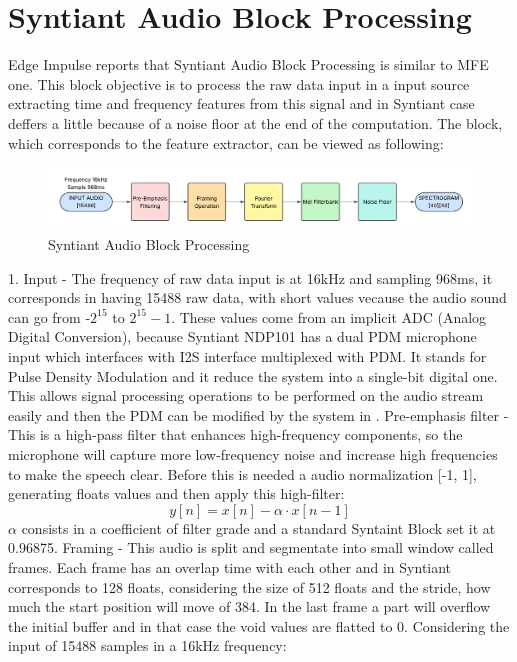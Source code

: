 \section{Syntiant Audio Block Processing}
\label{sec:audio}
Edge Impulse reports that Syntiant Audio Block Processing is similar to MFE one\cite{syntiant_audio_block}. This block objective is to process the raw data input in a input source extracting time and frequency features from this signal and in Syntiant case deffers a little because of a noise floor at the end of the computation. The block, which corresponds to the feature extractor, can be viewed as following:
\begin{figure}[!h]
    \centering
    \includegraphics[width=1.0\textwidth]{images/2.03 MFE Block Processing.png}
    \caption{Syntiant Audio Block Processing}
\end{figure} 
1. Input - The frequency of raw data input is at 16kHz and sampling 968ms, it corresponds in having 15488 raw data, with short values vecause the audio sound can go from -$2^15$ to $2^15-1$. These values come from an implicit ADC (Analog Digital Conversion), because Syntiant NDP101 has a dual PDM microphone input which interfaces with I2S interface multiplexed with PDM\cite{PDM_module}. It stands for Pulse Density Modulation and it reduce the system into a single-bit digital one. This allows signal processing operations to be performed on the audio stream easily and then the PDM can be modified by the system in  . Pre-emphasis filter - This is a high-pass filter that enhances high-frequency components, so the microphone will capture more low-frequency noise and increase high frequencies to make the speech clear. Before this is needed a audio normalization [-1, 1], generating floats values and then apply this high-filter:
\begin{equation}
    y[n]=x[n]-\alpha\cdot x[n-1]
\end{equation}
$\alpha$ consists in a coefficient of filter grade and a standard Syntaint Block set it at 0.96875. Framing - This audio is split and segmentate into small window called frames. Each frame has an overlap time with each other and in Syntiant corresponds to 128 floats, considering the size of 512 floats and the stride, how much the start position will move of 384. In the last frame a part will overflow the initial buffer and in that case the void values are flatted to 0. Considering the input of 15488 samples in a 16kHz frequency:\newline
